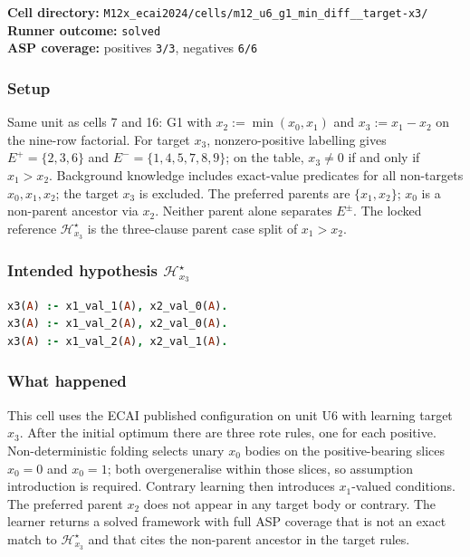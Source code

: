 \documentclass[11pt]{article}
\begin{document}
\textbf{Cell directory:} \texttt{M12x\_ecai2024/cells/m12\_u6\_g1\_min\_diff\_\_target-x3/}\\
\textbf{Runner outcome:} \texttt{solved}\\
\textbf{ASP coverage:} positives \texttt{3/3}, negatives \texttt{6/6}

\subsubsection{Setup}

Same unit as cells 7 and 16: G1 with \(x_2:=\min(x_0,x_1)\) and \(x_3:=x_1-x_2\) on the nine-row factorial. For target \(x_3\), nonzero-positive labelling gives \(E^+=\{2,3,6\}\) and \(E^-=\{1,4,5,7,8,9\}\); on the table, \(x_3\neq 0\) if and only if \(x_1>x_2\). Background knowledge includes exact-value predicates for all non-targets \(x_0,x_1,x_2\); the target \(x_3\) is excluded. The preferred parents are \(\{x_1,x_2\}\); \(x_0\) is a non-parent ancestor via \(x_2\). Neither parent alone separates \(E^\pm\). The locked reference \(\mathcal{H}_{x_3}^\star\) is the three-clause parent case split of \(x_1>x_2\).

\subsubsection{\texorpdfstring{Intended hypothesis \(\mathcal{H}_{x_3}^\star\)}{Intended hypothesis H-star(x3)}}

\begin{lstlisting}[style=logic,language=Prolog]
x3(A) :- x1_val_1(A), x2_val_0(A).
x3(A) :- x1_val_2(A), x2_val_0(A).
x3(A) :- x1_val_2(A), x2_val_1(A).
\end{lstlisting}

\subsubsection{What happened}

This cell uses the ECAI published configuration on unit U6 with learning target \(x_3\). After the initial optimum there are three rote rules, one for each positive. Non-deterministic folding selects unary \(x_0\) bodies on the positive-bearing slices \(x_0=0\) and \(x_0=1\); both overgeneralise within those slices, so assumption introduction is required. Contrary learning then introduces \(x_1\)-valued conditions. The preferred parent \(x_2\) does not appear in any target body or contrary. The learner returns a solved framework with full ASP coverage that is not an exact match to \(\mathcal{H}_{x_3}^\star\) and that cites the non-parent ancestor in the target rules.
\end{document}
